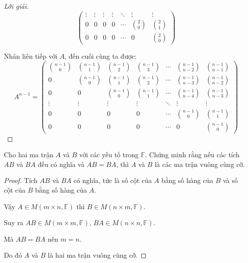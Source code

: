 \documentclass[class=linearalgebra,crop=false]{standalone}
\begin{document}
\begin{proof}[Lời giải]
\[\begin{pmatrix}
            \vdots       & \vdots       & \vdots       & \vdots       & \ddots & \vdots       & \vdots       \\
            0            & 0            & 0            & 0            & \cdots & \binom{2}{0} & \binom{2}{1} \\
            0            & 0            & 0            & 0            & \cdots & 0            & \binom{2}{0}
        \end{pmatrix}
    \]
    \par Nhân liên tiếp với $A$, đến cuối cùng ta được:
    \[
        A^{n-1} =
        \begin{pmatrix}
            \binom{n-1}{0} & \binom{n-1}{1} & \binom{n-1}{2} & \binom{n-1}{3} & \cdots & \binom{n-1}{n-2} & \binom{n-1}{n-1} \\
            0              & \binom{n-1}{0} & \binom{n-1}{1} & \binom{n-1}{2} & \cdots & \binom{n-1}{n-3} & \binom{n-1}{n-2} \\
            0              & 0              & \binom{n-1}{0} & \binom{n-1}{1} & \cdots & \binom{n-1}{n-4} & \binom{n-1}{n-3} \\
            \vdots         & \vdots         & \vdots         & \vdots         & \ddots & \vdots           & \vdots           \\
            0              & 0              & 0              & 0              & \cdots & \binom{n-1}{0}   & \binom{n-1}{1}   \\
            0              & 0              & 0              & 0              & \cdots & 0                & \binom{n-1}{0}
        \end{pmatrix}
    \]
\end{proof}

\begin{exercise}
    Cho hai ma trận $A$ và $B$ với các yếu tố trong $\mathbb{F}$. Chứng minh rằng nếu các tích $AB$ và $BA$ đều có nghĩa và $AB = BA$, thì $A$ và $B$ là các ma trận vuông cùng cỡ.
\end{exercise}

\begin{proof}
    Tích $AB$ và $BA$ có nghĩa, tức là số cột của $A$ bằng số hàng của $B$ và số cột của $B$ bằng số hàng của $A$.
    \par Vậy $A\in M(m\times n,\mathbb{F})$ thì $B\in M(n\times m, \mathbb{F})$.
    \par Suy ra $AB\in M(m\times m,\mathbb{F})$, $BA\in M(n\times n,\mathbb{F})$.
    \par Mà $AB = BA$ nên $m = n$.
    \par Do đó $A$ và $B$ là hai ma trận vuông cùng cỡ.
\end{proof}
\end{document}
